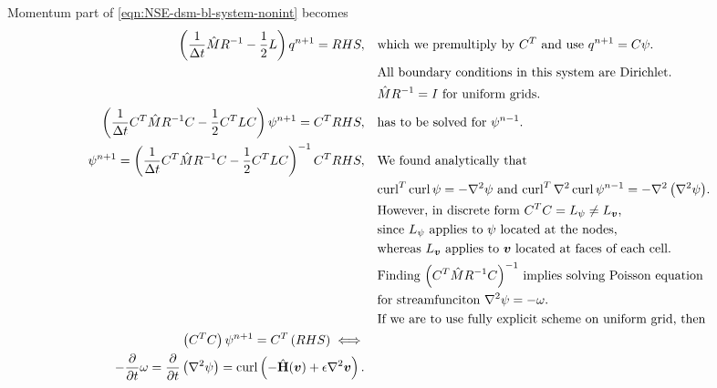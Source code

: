\documentclass{article}
\numberwithin{equation}{section}
\begin{document}
Momentum part of \cref{eqn:NSE-dsm-bl-system-nonint} becomes
\begin{align}
	\left(\frac{1}{\Delta t}\hat{M}R^{-1} - \frac{1}{2}L\right)q^{n+1}=RHS, &\quad\text{which we premultiply by $C^T$ and use $q^{n+1}=C\psi$.}\\
	&\quad\text{All boundary conditions in this system are Dirichlet.}\notag\\
	&\quad\text{$	\hat{M}R^{-1}=I$ for uniform grids.}\notag\\
	\left(\frac{1}{\Delta t}C^T\hat{M}R^{-1}C - \frac{1}{2}C^TLC\right)\psi^{n+1}=C^TRHS, &\quad\text{has to be solved for $\psi^{n-1}$.}\\
	\psi^{n+1} = \left(\frac{1}{\Delta t}C^T\hat{M}R^{-1}C - \frac{1}{2}C^TLC\right)^{-1}C^TRHS,
	&\quad\text{We found analytically that  }\notag\\
	&\quad\text{$\operatorname{curl}^T\operatorname{curl}\psi=-\nabla^2\psi$ and $\operatorname{curl}^T\nabla^2\operatorname{curl}\psi^{n-1}=-\nabla^2\left(\nabla^2\psi\right)$.}\notag\\
	&\quad\text{However, in discrete form $C^TC=L_\psi \neq L_{\boldsymbol{v}}$,}\notag\\
	&\quad\text{since $L_\psi$ applies to $\psi$ located at the nodes,}\notag\\
	&\quad\text{whereas $L_{\boldsymbol{v}}$ applies to $\boldsymbol{v}$ located at faces of each cell.}\notag\\
	&\quad\text{Finding $\left(C^T\hat{M}R^{-1}C\right)^{-1}$ implies solving Poisson equation}\notag\\
	&\quad\text{for streamfunciton $\nabla^2\psi=-\omega$.}\notag\\
	&\quad\text{If we are to use fully explicit scheme on uniform grid, then}\notag\\
	\left(C^TC\right)\psi^{n+1}=C^T\left(RHS\right)\iff\\
	-\frac{\partial }{\partial t}\omega=\frac{\partial}{\partial t}\left(\nabla^2\psi\right)=\operatorname{curl}\left(-\hat{\mathbf{H}}(\boldsymbol{v})+\epsilon\nabla^2\boldsymbol{v}\right).
\end{align}
\end{document}
